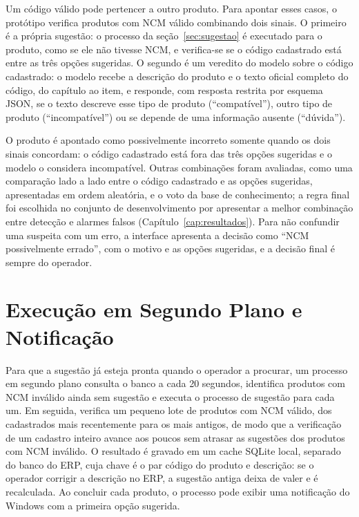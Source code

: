 Um código válido pode pertencer a outro produto. Para apontar esses casos, o protótipo verifica produtos com NCM válido combinando dois sinais. O primeiro é a própria sugestão: o processo da seção~\ref{sec:sugestao} é executado para o produto, como se ele não tivesse NCM, e verifica-se se o código cadastrado está entre as três opções sugeridas. O segundo é um veredito do modelo sobre o código cadastrado: o modelo recebe a descrição do produto e o texto oficial completo do código, do capítulo ao item, e responde, com resposta restrita por esquema JSON, se o texto descreve esse tipo de produto (``compatível''), outro tipo de produto (``incompatível'') ou se depende de uma informação ausente (``dúvida'').

O produto é apontado como possivelmente incorreto somente quando os dois sinais concordam: o código cadastrado está fora das três opções sugeridas e o modelo o considera incompatível. Outras combinações foram avaliadas, como uma comparação lado a lado entre o código cadastrado e as opções sugeridas, apresentadas em ordem aleatória, e o voto da base de conhecimento; a regra final foi escolhida no conjunto de desenvolvimento por apresentar a melhor combinação entre detecção e alarmes falsos (Capítulo~\ref{cap:resultados}). Para não confundir uma suspeita com um erro, a interface apresenta a decisão como ``NCM possivelmente errado'', com o motivo e as opções sugeridas, e a decisão final é sempre do operador.

\section{Execução em Segundo Plano e Notificação}

Para que a sugestão já esteja pronta quando o operador a procurar, um processo em segundo plano consulta o banco a cada 20 segundos, identifica produtos com NCM inválido ainda sem sugestão e executa o processo de sugestão para cada um. Em seguida, verifica um pequeno lote de produtos com NCM válido, dos cadastrados mais recentemente para os mais antigos, de modo que a verificação de um cadastro inteiro avance aos poucos sem atrasar as sugestões dos produtos com NCM inválido. O resultado é gravado em um cache SQLite local, separado do banco do ERP, cuja chave é o par código do produto e descrição: se o operador corrigir a descrição no ERP, a sugestão antiga deixa de valer e é recalculada. Ao concluir cada produto, o processo pode exibir uma notificação do Windows com a primeira opção sugerida.

